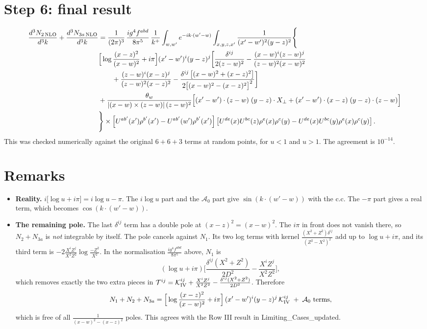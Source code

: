 \documentclass[10pt]{article}
\begin{document}
\section*{Step 6: final result}
\begin{align}
\frac{d^{3}N_{2\,\rm NLO}}{d^{3}k}+\frac{d^{3}N_{3a\,\rm NLO}}{d^{3}k}&=\frac{1}{(2\pi)^{3}}\,\frac{ig^{4}f^{abd}}{8\pi^{5}}\,\frac{1}{k^{+}}\int_{w,w'}e^{-ik\cdot(w'-w)}\int_{x,y,z,x'}\frac{1}{(x'-w')^{2}(y-z)^{2}}\Bigg\{\notag\\
&\Big[\log\frac{(x-z)^{2}}{(x-w)^{2}}+i\pi\Big](x'-w')^{i}(y-z)^{j}\bigg[\frac{\delta^{ij}}{2(z-w)^{2}}-\frac{(x-w)^{i}(z-w)^{j}}{(z-w)^{2}(x-w)^{2}}\notag\\&\qquad+\frac{(z-w)^{i}(x-z)^{j}}{(z-w)^{2}(x-z)^{2}}-\frac{\delta^{ij}\,\big[(x-w)^{2}+(x-z)^{2}\big]}{2\big[(x-w)^{2}-(x-z)^{2}\big]^{2}}\bigg]\notag\\
&+\frac{\theta_{w}}{|(x-w)\times(z-w)|\,(z-w)^{2}}\Big[(x'-w')\cdot(z-w)\;(y-z)\cdot X_{\perp}+(x'-w')\cdot(x-z)\;(y-z)\cdot(z-w)\Big]\notag\\
&\Bigg\}\times\left[U^{ab'}(x')\rho^{b'}(x')-U^{ab'}(w')\rho^{b'}(x')\right]\left[U^{de}(x)U^{bc}(z)\rho^{e}(x)\rho^{c}(y)-U^{de}(x)U^{bc}(y)\rho^{e}(x)\rho^{c}(y)\right].
\end{align}
This was checked numerically against the original $6+6+3$ terms at random points, for $u<1$ and $u>1$. The agreement is $10^{-14}$.

\section*{Remarks}
\begin{itemize}
\item \textbf{Reality.} $i\big[\log u+i\pi\big]=i\log u-\pi$. The $i\log u$ part and the $\mathcal A_{0}$ part give $\sin(k\cdot(w'-w))$ with the c.c. The $-\pi$ part gives a real term, which becomes $\cos(k\cdot(w'-w))$.
\item \textbf{The remaining pole.} The last $\delta^{ij}$ term has a double pole at $(x-z)^{2}=(x-w)^{2}$. The $i\pi$ in front does not vanish there, so $N_{2}+N_{3a}$ is \emph{not} integrable by itself. The pole cancels against $N_{1}$. Its two log terms with kernel $\frac{(X^{2}+Z^{2})\delta^{ij}}{(Z^{2}-X^{2})^{2}}$ add up to $\log u+i\pi$, and its third term is $-2\frac{X^{i}Z^{j}}{X^{2}Z^{2}}\log\frac{-Z^{2}}{X^{2}}$. In the normalisation $\frac{ig^{4}f^{abd}}{8\pi^{5}}$ above, $N_{1}$ is
\begin{equation}
(\log u+i\pi)\Big[\frac{\delta^{ij}(X^{2}+Z^{2})}{2D^{2}}-\frac{X^{i}Z^{j}}{X^{2}Z^{2}}\Big],
\end{equation}
which removes exactly the two extra pieces in $\mathcal T^{ij}=\mathcal K_{\rm IV}^{ij}+\frac{X^{i}Z^{j}}{X^{2}Z^{2}}-\frac{\delta^{ij}(X^{2}+Z^{2})}{2D^{2}}$. Therefore
\begin{equation}
N_{1}+N_{2}+N_{3a}=\Big[\log\frac{(x-z)^{2}}{(x-w)^{2}}+i\pi\Big]\,(x'-w')^{i}(y-z)^{j}\,\mathcal K^{ij}_{\rm IV}\;+\;\mathcal A_{0}\text{ terms},
\end{equation}
which is free of all $\frac{1}{(x-w)^{2}-(x-z)^{2}}$ poles. This agrees with the Row III result in Limiting\_Cases\_updated.
\end{itemize}
\end{document}
